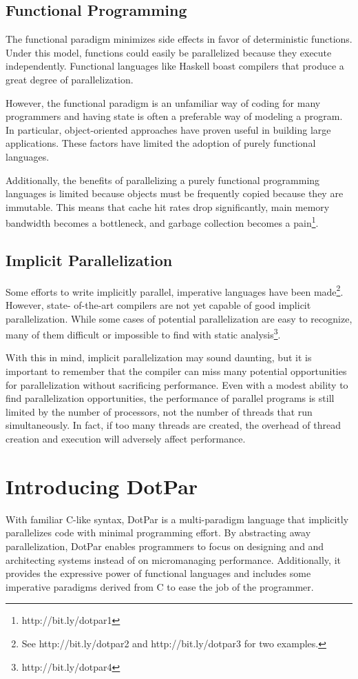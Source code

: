 \subsection{Functional Programming}
The functional paradigm minimizes side effects in favor of
deterministic functions. Under this model, functions could easily be
parallelized because they execute independently. Functional languages
like Haskell boast compilers that produce a great degree of
parallelization.

However, the functional paradigm is an unfamiliar way of coding for
many programmers and having state is often a preferable way of
modeling a program. In particular, object-oriented approaches have
proven useful in building large applications. These factors have
limited the adoption of purely functional languages.

Additionally, the benefits of parallelizing a purely functional
programming languages is limited because objects must be frequently
copied because they are immutable. This means that cache hit rates
drop significantly, main memory bandwidth becomes a bottleneck, and
garbage collection becomes a pain\footnote{http://bit.ly/dotpar1}.

\subsection{Implicit Parallelization}
Some efforts to write implicitly parallel, imperative languages have
been made\footnote{See http://bit.ly/dotpar2 and http://bit.ly/dotpar3
  for two examples.}. However, state- of-the-art compilers are not yet
capable of good implicit parallelization. While some cases of
potential parallelization are easy to recognize, many of them
difficult or impossible to find with static
analysis\footnote{http://bit.ly/dotpar4}.

With this in mind, implicit parallelization may sound daunting, but it
is important to remember that the compiler can miss many potential
opportunities for parallelization without sacrificing
performance. Even with a modest ability to find parallelization
opportunities, the performance of parallel programs is still limited
by the number of processors, not the number of threads that run
simultaneously. In fact, if too many threads are created, the overhead
of thread creation and execution will adversely affect performance.

\section{Introducing DotPar}
With familiar C-like syntax, DotPar is a multi-paradigm language that
implicitly parallelizes code with minimal programming effort. By
abstracting away parallelization, DotPar enables programmers to focus
on designing and and architecting systems instead of on micromanaging
performance. Additionally, it provides the expressive power of
functional languages and includes some imperative paradigms derived
from C to ease the job of the programmer.

